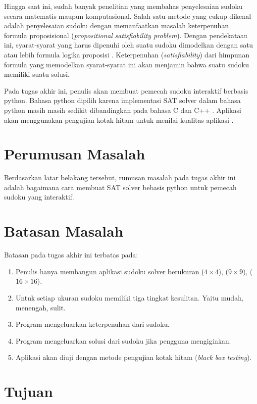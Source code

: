 Hingga saat ini, sudah banyak penelitian yang membahas penyelesaian sudoku secara
matematis maupun komputasional. Salah satu metode yang cukup dikenal adalah penyelesaian
sudoku dengan memanfaatkan masalah keterpenuhan formula proposisional (\textit{propositional satisfiability problem}). Dengan pendekataan ini, syarat-syarat yang
harus dipenuhi oleh suatu sudoku dimodelkan dengan satu atau lebih formula logika proposisi \cite{KJ06,LO06}.
Keterpenuhan (\textit{satisfiability}) dari himpunan formula yang memodelkan syarat-syarat
ini akan menjamin bahwa suatu sudoku memiliki suatu solusi.

Pada tugas akhir ini, penulis akan membuat pemecah sudoku interaktif berbasis python. Bahasa python dipilih
karena implementasi SAT solver dalam bahasa python masih masih sedikit dibandingkan pada bahasa C dan C++ \cite{SATPy1}. Aplikasi akan menggunakan pengujian kotak hitam untuk menilai kualitas aplikasi \cite{TEST1}.

\section{Perumusan Masalah}

Berdasarkan latar belakang tersebut, rumusan masalah pada tugas akhir ini
adalah bagaimana cara membuat SAT solver bebasis python untuk pemecah sudoku yang interaktif.

\section{Batasan Masalah}

Batasan pada tugas akhir ini terbatas pada:
\begin{enumerate}
	\item Penulis hanya membangun aplikasi sudoku solver berukuran ($4\times4$), ($9\times9$), ($16\times16$).
	\item Untuk setiap ukuran sudoku memiliki tiga tingkat kesulitan. Yaitu mudah, menengah, sulit.
	\item Program mengeluarkan keterpenuhan dari sudoku.
	\item Program mengeluarkan solusi dari sudoku jika pengguna mengiginkan.
	\item Aplikasi akan diuji dengan metode
	pengujian kotak hitam (\textit{black box testing}).
\end{enumerate}

\section{Tujuan}

